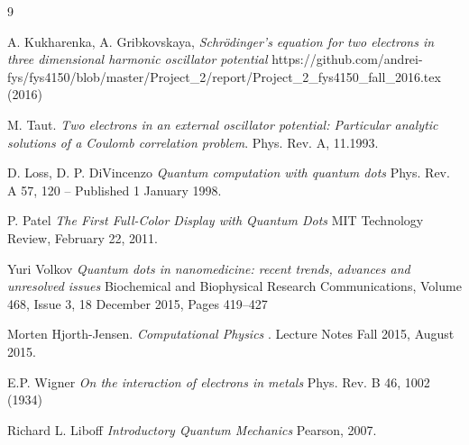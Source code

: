 \documentclass[10pt]{article}
\begin{document}
\begin{thebibliography} {9}

A. Kukharenka, A. Gribkovskaya,
\textit
{Schr\"{o}dinger's equation for two electrons in three dimensional harmonic oscillator potential
}
https://github.com/andrei-fys/fys4150/blob/master/Project\_2/report/Project\_2\_fys4150\_fall\_2016.tex (2016)


M. Taut. 
\textit{Two electrons in an external oscillator potential: Particular analytic solutions of a Coulomb correlation problem}.
Phys. Rev. A, 11.1993.


D. Loss, D. P. DiVincenzo
\textit{
Quantum computation with quantum dots
}
Phys. Rev. A 57, 120 – Published 1 January 1998.

P. Patel
\textit
{The First Full-Color Display with Quantum Dots
}
MIT Technology Review, February 22, 2011.

Yuri Volkov
\textit
{Quantum dots in nanomedicine: recent trends, advances and unresolved issues
}
Biochemical and Biophysical Research Communications, Volume 468, Issue 3, 18 December 2015, Pages 419–427

Morten Hjorth-Jensen. 
\textit{Computational Physics
}. 
Lecture Notes Fall 2015, August 2015.


E.P. Wigner
\textit
{On the interaction of electrons in metals
}
Phys. Rev. B 46, 1002 (1934) 

Richard L. Liboff
\textit
{Introductory Quantum Mechanics
}
Pearson, 2007.


\end{thebibliography}
\end{document}
